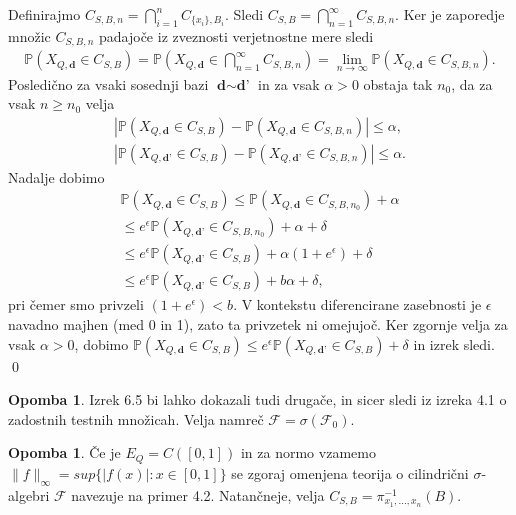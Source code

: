 \documentclass[12pt,a4paper]{amsart}
\theoremstyle{definition} %
\newtheorem{opomba}[definicija]{Opomba}
\theoremstyle{plain} %
\begin{document}
\proof Definirajmo $C_{S,B,n} = \bigcap_{i=1}^{n}C_{\{x_i\},B_i}$. Sledi $C_{S,B} = \bigcap_{n=1}^{\infty}C_{S,B,n}$. Ker je zaporedje množic $C_{S,B,n}$ padajoče iz zveznosti verjetnostne mere sledi
\begin{gather*}
\mathbb{P}(X_{Q,\textbf{d}} \in C_{S,B}) = \mathbb{P}(X_{Q,\textbf{d}} \in  \bigcap_{n=1}^{\infty}C_{S,B,n}) = \lim_{n \rightarrow \infty} \mathbb{P}(X_{Q,\textbf{d}} \in C_{S,B,n}).
\end{gather*}
Posledično za vsaki sosednji bazi $\textbf{d} \sim \textbf{d'}$ in za vsak $\alpha > 0$ obstaja tak $n_0$, da za vsak $n \geq n_0$ velja
\begin{gather*}
|\mathbb{P}(X_{Q,\textbf{d}} \in C_{S,B}) - \mathbb{P}(X_{Q,\textbf{d}} \in C_{S,B,n})| \leq  \alpha, \\ |\mathbb{P}(X_{Q,\textbf{d'}} \in C_{S,B}) - \mathbb{P}(X_{Q,\textbf{d'}} \in C_{S,B,n})| \leq \alpha.
\end{gather*}
Nadalje dobimo
\begin{gather*}
\mathbb{P}(X_{Q,\textbf{d}} \in C_{S,B})  \leq \mathbb{P}(X_{Q,\textbf{d}} \in C_{S,B, n_0}) + \alpha \\ \leq e^{\epsilon} \mathbb{P}(X_{Q,\textbf{d'}} \in C_{S,B,n_0})  + \alpha + \delta \\ \leq e^{\epsilon} \mathbb{P}(X_{Q,\textbf{d'}} \in C_{S,B})  + \alpha(1 + e^{\epsilon}) + \delta \\ \leq e^{\epsilon} \mathbb{P}(X_{Q,\textbf{d'}} \in C_{S,B})  + b \alpha + \delta,
\end{gather*}
pri čemer smo privzeli $(1+e^{\epsilon}) < b$. V kontekstu diferencirane zasebnosti je $\epsilon$ navadno majhen (med 0 in 1), zato ta privzetek ni omejujoč. Ker zgornje velja za vsak $\alpha > 0$, dobimo $\mathbb{P}(X_{Q,\textbf{d}} \in C_{S,B}) \leq e^{\epsilon} \mathbb{P}(X_{Q,\textbf{d'}} \in C_{S,B}) + \delta$ in izrek sledi.
\qed
\newline
\begin{opomba}
Izrek 6.5 bi lahko dokazali tudi drugače, in sicer sledi iz izreka 4.1 o zadostnih testnih množicah. Velja namreč $\mathcal{F} = \sigma(\mathcal{F}_0).$
\end{opomba}
\begin{opomba}
Če je $E_Q = C ([0,1])$ in za normo vzamemo $\|f\|_{\infty} = sup\{|f(x)| : x \in [0,1]\}$ se zgoraj omenjena teorija o cilindrični $\sigma$-algebri $\mathcal{F}$ navezuje na primer 4.2. Natančneje, velja $C_{S,B} = \pi_{x_1,...,x_n}^{-1} (B).$
\end{opomba}
\end{document}
